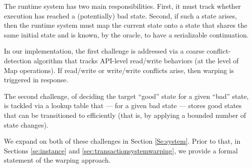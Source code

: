 The runtime system has two main responsibilities. First, it must track whether execution has reached a (potentially) bad state. Second, if such a state arises, then the runtime system must map the current state onto a state that shares the same initial state and is known, by the oracle, to have a serializable continuation. 

In our implementation, the first challenge is addressed via a coarse conflict-detection algorithm that tracks API-level read/write behaviors (at the level of {\sf Map} operations). If read/write or write/write conflicts arise, then warping is triggered in response. 

The second challenge, of deciding the target ``good'' state for a given ``bad'' state, is tackled via a lookup table that --- for a given bad state --- stores good states that can be transitioned to efficiently (that is, by applying a bounded number of state changes).

We expand on both of these challenges in Section \ref{Se:system}. Prior to that, in Sections \ref{se:instance} and \ref{sec:transactionsystemwarping}, we provide a formal statement of the warping approach.